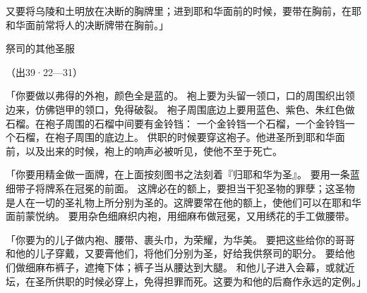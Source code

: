 {又要将乌陵和土明放在决断的胸牌里；{}进到耶和华面前的时候，要带在胸前，在耶和华面前常将{}人的决断牌带在胸前。」
\par }{\SH 祭司的其他圣服
\par }{\R （出39·22—31）
\par }{\PP {}「你要做以弗得的外袍，颜色全是蓝的。
袍上要为头留一领口，口的周围织出领边来，仿佛铠甲的领口，免得破裂。
袍子周围底边上要用蓝色、紫色、朱红色{}做石榴。在袍子周围的石榴中间要有金铃铛：
一个金铃铛一个石榴，一个金铃铛一个石榴，在袍子周围的底边上。
供职的时候要穿这袍子。他进圣所到耶和华面前，以及出来的时候，袍上的响声必被听见，使他不至于死亡。
\par }{\PP {}「你要用精金做一面牌，在上面按刻图书之法刻着『归耶和华为圣』。
要用一条蓝细带子将牌系在冠冕的前面。
这牌必在{}的额上，{}要担当干犯圣物{}的罪孽；这圣物是{}人在一切的圣礼物上所分别为圣的。这牌要常在他的额上，使他们可以在耶和华面前蒙悦纳。
要用杂色细麻{}织内袍，用细麻布做冠冕，又用绣花的手工做腰带。
\par }{\PP {}「你要为{}的儿子做内袍、腰带、裹头巾，为荣耀，为华美。
要把这些给你的哥哥{}和他的儿子穿戴，又要膏他们，将他们分别为圣，好给我供祭司的职分。
要给他们做细麻布裤子，遮掩下体；裤子当从腰达到大腿。
和他儿子进入会幕，或就近坛，在圣所供职的时候必穿上，免得担罪而死。这要为{}和他的后裔作永远的定例。」

}
